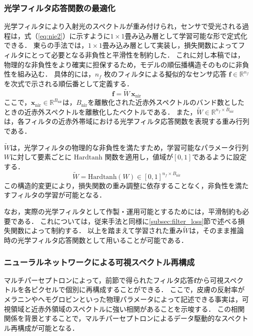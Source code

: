 \documentclass[MIRU,submit]{miru2026j}
\begin{document}
\subsubsection{光学フィルタ応答関数の最適化}\label{subsec:filter}
光学フィルタにより入射光のスペクトルが重み付けられ，センサで受光される過程は，式（\ref{eq:nie2}）に示すように$1 \times 1$畳み込み層として学習可能な形で定式化できる．
東らの手法では，$1 \times 1$畳み込み層として実装し，損失関数によってフィルタにとって必要となる非負性と平滑性を制約した\cite{proc:higashi}．
これに対し本稿では，物理的な非負性をより確実に担保するため，モデルの順伝播構造そのものに非負性を組み込む．
具体的には，$n_f$ 枚のフィルタによる擬似的なセンサ応答 $\bm{f} \in \mathbb{R}^{n_f}$を次式で示される順伝番として定義する．
\begin{equation}
\bm{f} = \tilde{W}\,\bm{x}_{\mathrm{nir}} \label{eq:f}
\end{equation}
ここで，$\bm{x}_{\mathrm{nir}} \in \mathbb{R}^{B_{\mathrm{nir}}}$は，$B_{\mathrm{nir}}$を離散化された近赤外スペクトルのバンド数としたときの近赤外スペクトルを離散化したベクトルである．
また，$\tilde{W} \in \mathbb{R}^{n_f \times B_{\mathrm{nir}}}$ は，各フィルタの近赤外帯域における光学フィルタ応答関数を表現する重み行列である．

$\tilde{W}$は，光学フィルタの物理的な非負性を満たすため，学習可能なパラメータ行列$W$に対して要素ごとに $\mathrm{Hardtanh}$ 関数を適用し，値域が$[0, 1]$であるように設定する．
\begin{equation}
\tilde{W} = \mathrm{Hardtanh}(W) \in [0,1]^{n_f \times B_{\mathrm{nir}}} \label{eq:w}
\end{equation}
この構造的変更により，損失関数の重み調整に依存することなく，非負性を満たすフィルタの学習が可能となる．

なお，実際の光学フィルタとして作製・運用可能とするためには，平滑制約も必要である．
これについては，従来手法と同様に\ref{subsec:filter_loss}節で述べる損失関数によって制約する．
以上を踏まえて学習された重み$\tilde{W}$は，そのまま推論時の光学フィルタ応答関数として用いることが可能である．

\subsubsection{ニューラルネットワークによる可視スペクトル再構成}\label{subsec:reconstruction}
マルチパーセプトロンによって，前節で得られたフィルタ応答$\bm{f}$から可視スペクトルを各ピクセルで個別に再構成することができる．
ここで，皮膚の反射率がメラニンやヘモグロビンといった物理パラメータによって記述できる事実は，可視領域と近赤外領域のスペクトルに強い相関があることを示唆する．
この相関関係を背景とすることで，マルチパーセプトロンによるデータ駆動的なスペクトル再構成が可能となる．
\end{document}
